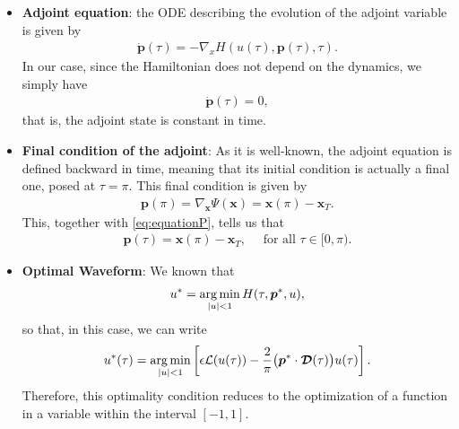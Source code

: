 \begin{itemize}
    \item[1.] \textbf{Adjoint equation}: the ODE describing the evolution of the adjoint variable is given by 
    \begin{align*}
    	\dot{\bm{p}}(\tau) = -\nabla_x H(u(\tau),\bm{p}(\tau),\tau).
    \end{align*}
    In our case, since the Hamiltonian does not depend on the dynamics, we simply have
    \begin{align}\label{eq:equationP}
    	\dot{\bm{p}}(\tau) = 0,
    \end{align}
	that is, the adjoint state is constant in time.
	
	\item[2.] \textbf{Final condition of the adjoint}: As it is well-known, the adjoint equation is defined backward in time, meaning that its initial condition is actually a final one, posed at $\tau=\pi$. This final condition is given by 
    \begin{align*}
    	\bm{p}(\pi) = \nabla_{\bm{x}} \Psi(\bm{x}) = \bm{x}(\pi) - \bm{x}_T.
    \end{align*} 
	This, together with \eqref{eq:equationP}, tells us that
	\begin{align*}
		\bm{p}(\tau) = \bm{x}(\pi) - \bm{x}_T, \quad \mbox{ for all }\tau\in [0,\pi).
	\end{align*} 
    
    \item[3.] \textbf{Optimal  Waveform}: We known that 
    \begin{align*}
    	u^* = \operatorname*{arg\,min}_{|u|<1} H(\tau,\bm{p}^*,u),
    \end{align*}
	so that, in this case, we can write
    \begin{gather}
        u^*(\tau) = \operatorname*{arg\,min}_{|u|<1}  \left[\epsilon \mathcal{L}(u(\tau)) - \frac 2\pi \big(\bm{p}^* \cdot \bm{\mathcal{D}}(\tau)\big) u(\tau) \right].
    \end{gather}
    Therefore, this optimality condition reduces to the optimization of a function in a variable within the interval $ [- 1,1] $. 
\end{itemize}
\vspace{1em}
